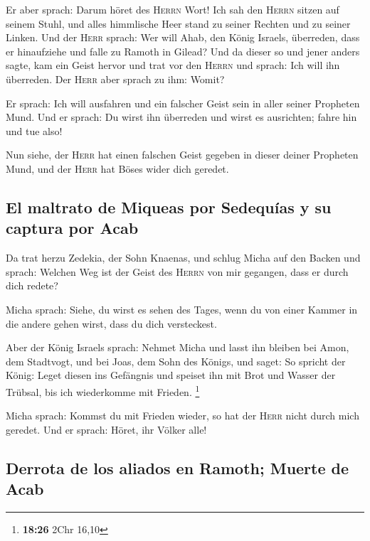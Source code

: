  Er aber sprach: Darum höret des \textsc{Herrn} Wort! Ich
sah den \textsc{Herrn} sitzen auf seinem Stuhl, und alles himmlische
Heer stand zu seiner Rechten und zu seiner Linken.  Und
der \textsc{Herr} sprach: Wer will Ahab, den König Israels, überreden,
dass er hinaufziehe und falle zu Ramoth in Gilead? Und da dieser so und
jener anders sagte,  kam ein Geist hervor und trat vor
den \textsc{Herrn} und sprach: Ich will ihn überreden. Der \textsc{Herr}
aber sprach zu ihm: Womit?

 Er sprach: Ich will ausfahren und ein falscher Geist
sein in aller seiner Propheten Mund. Und er sprach: Du wirst ihn
überreden und wirst es ausrichten; fahre hin und tue also!

 Nun siehe, der \textsc{Herr} hat einen falschen Geist
gegeben in dieser deiner Propheten Mund, und der \textsc{Herr} hat Böses
wider dich geredet.

\hypertarget{el-maltrato-de-miqueas-por-sedequuxedas-y-su-captura-por-acab}{%
\subsection{El maltrato de Miqueas por Sedequías y su captura por
Acab}\label{el-maltrato-de-miqueas-por-sedequuxedas-y-su-captura-por-acab}}

 Da trat herzu Zedekia, der Sohn Knaenas, und schlug
Micha auf den Backen und sprach: Welchen Weg ist der Geist des
\textsc{Herrn} von mir gegangen, dass er durch dich redete?

 Micha sprach: Siehe, du wirst es sehen des Tages, wenn
du von einer Kammer in die andere gehen wirst, dass du dich versteckest.

 Aber der König Israels sprach: Nehmet Micha und lasst
ihn bleiben bei Amon, dem Stadtvogt, und bei Joas, dem Sohn des Königs,
 und saget: So spricht der König: Leget diesen ins
Gefängnis und speiset ihn mit Brot und Wasser der Trübsal, bis ich
wiederkomme mit Frieden. \footnote{\textbf{18:26} 2Chr 16,10}

 Micha sprach: Kommst du mit Frieden wieder, so hat der
\textsc{Herr} nicht durch mich geredet. Und er sprach: Höret, ihr Völker
alle!

\hypertarget{derrota-de-los-aliados-en-ramoth-muerte-de-acab}{%
\subsection{Derrota de los aliados en Ramoth; Muerte de
Acab}\label{derrota-de-los-aliados-en-ramoth-muerte-de-acab}}

